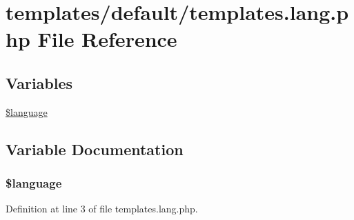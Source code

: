 \hypertarget{templates_8lang_8php}{\section{templates/default/templates.lang.\+php File Reference}
\label{templates_8lang_8php}
}
\subsection*{Variables}
\begin{DoxyCompactItemize}
\item 
\hyperlink{templates_8lang_8php_a83170d318260a5a2e2a79dccdd371b10}{\$language}
\end{DoxyCompactItemize}


\subsection{Variable Documentation}
\hypertarget{templates_8lang_8php_a83170d318260a5a2e2a79dccdd371b10}{
\subsubsection[{\$language}]{\setlength{\rightskip}{0pt plus 5cm}\${\bf language}}}\label{templates_8lang_8php_a83170d318260a5a2e2a79dccdd371b10}


Definition at line 3 of file templates.\+lang.\+php.

